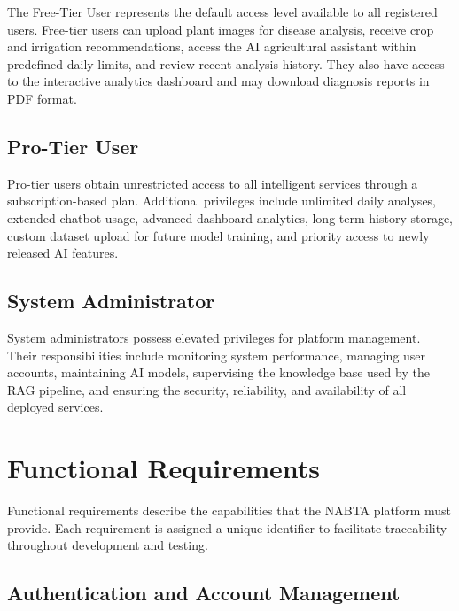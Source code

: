 The Free-Tier User represents the default access level available to all registered users. Free-tier users can upload plant images for disease analysis, receive crop and irrigation recommendations, access the AI agricultural assistant within predefined daily limits, and review recent analysis history. They also have access to the interactive analytics dashboard and may download diagnosis reports in PDF format.

\subsection{Pro-Tier User}
\label{subsec:pro_user}

Pro-tier users obtain unrestricted access to all intelligent services through a subscription-based plan. Additional privileges include unlimited daily analyses, extended chatbot usage, advanced dashboard analytics, long-term history storage, custom dataset upload for future model training, and priority access to newly released AI features.

\subsection{System Administrator}
\label{subsec:admin_user}

System administrators possess elevated privileges for platform management. Their responsibilities include monitoring system performance, managing user accounts, maintaining AI models, supervising the knowledge base used by the RAG pipeline, and ensuring the security, reliability, and availability of all deployed services.

\section{Functional Requirements}
\label{sec:functional_requirements}

Functional requirements describe the capabilities that the NABTA platform must provide. Each requirement is assigned a unique identifier to facilitate traceability throughout development and testing.

\subsection{Authentication and Account Management}
\label{subsec:fr_auth}

